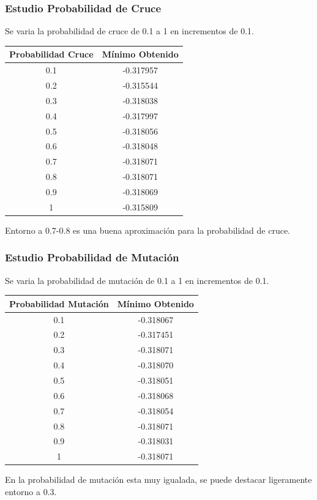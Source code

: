 \documentclass[12pt]{article}
\begin{document}
\subsubsection*{Estudio Probabilidad de Cruce}
	Se varia la probabilidad de cruce de 0.1 a 1 en incrementos de 0.1.
\begin{table}[H]
\begin{center}
\begin{tabular}{|cc|} \hline
Probabilidad Cruce & Mínimo Obtenido \\  \hline
0.1 & -0.317957 \\ 
0.2 & -0.315544 \\ 
0.3 & -0.318038 \\
0.4 & -0.317997 \\
0.5 & -0.318056 \\
0.6 & -0.318048 \\
0.7 & -0.318071 \\
0.8 & -0.318071 \\ 
0.9 & -0.318069 \\
1   & -0.315809 \\  \hline
\end{tabular}
\end{center}
\end{table}
	Entorno a 0.7-0.8 es una buena aproximación para la probabilidad de cruce.	

\subsubsection*{Estudio Probabilidad de Mutación}
	Se varia la probabilidad de mutación de 0.1 a 1 en incrementos de 0.1.
\begin{table}[H]
\begin{center}
\begin{tabular}{|cc|} \hline
Probabilidad Mutación & Mínimo Obtenido \\  \hline
0.1 & -0.318067 \\ 
0.2 & -0.317451 \\ 
0.3 & -0.318071 \\
0.4 & -0.318070 \\
0.5 & -0.318051 \\
0.6 & -0.318068 \\
0.7 & -0.318054 \\
0.8 & -0.318071 \\ 
0.9 & -0.318031 \\
1   & -0.318071 \\  \hline
\end{tabular}
\end{center}
\end{table}
	En la probabilidad de mutación esta muy igualada, se puede destacar ligeramente entorno a 0.3.
\end{document}
